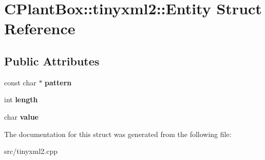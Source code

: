 \hypertarget{structCPlantBox_1_1tinyxml2_1_1Entity}{}\section{C\+Plant\+Box\+:\+:tinyxml2\+:\+:Entity Struct Reference}
\label{structCPlantBox_1_1tinyxml2_1_1Entity}
\subsection*{Public Attributes}
\begin{DoxyCompactItemize}
\item 
\mbox{\label{structCPlantBox_1_1tinyxml2_1_1Entity_a5c27c4610df979ddd9f4a3a1474a43a8}} 
const char $\ast$ {\bfseries pattern}
\item 
\mbox{\label{structCPlantBox_1_1tinyxml2_1_1Entity_a8ddf4afe02fa979373722af63497b1cd}} 
int {\bfseries length}
\item 
\mbox{\label{structCPlantBox_1_1tinyxml2_1_1Entity_a721e95d54659aa54191ba3df0d42e6a7}} 
char {\bfseries value}
\end{DoxyCompactItemize}


The documentation for this struct was generated from the following file\+:\begin{DoxyCompactItemize}
\item 
src/tinyxml2.\+cpp\end{DoxyCompactItemize}
